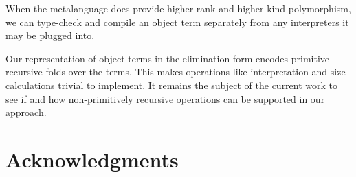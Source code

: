 When the metalanguage does provide higher-rank and higher-kind
polymorphism, we can type-check and compile an object term separately
from any interpreters it may be plugged into.

Our representation of object terms in the elimination form encodes
primitive recursive folds over the terms. This makes operations like
interpretation and size calculations trivial to implement. It remains
the subject of the current work to see if and how non-primitively 
recursive operations can be supported in our approach.

\section*{Acknowledgments}
\ourthanks


\bibsep=0pt


